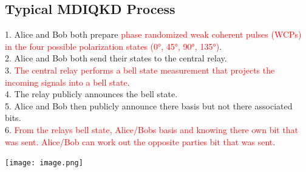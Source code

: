 \documentclass{article}
\begin{document}
\begin{tcolorbox}
\subsection*{Typical MDIQKD Process}

\begin{multicols}{2}

1. Alice and Bob both prepare \textcolor{red}{phase randomized weak coherent pulses (WCPs) in the four possible polarization states (\ang{0}, \ang{45}, \ang{90}, \ang{135})}.\\
2. Alice and Bob both send their states to the central relay.\\
3. \textcolor{red}{The central relay performs a bell state measurement that projects the incoming signals into a bell state}.\\
4. The relay publicly announces the bell state.\\
5. Alice and Bob then publicly announce there basis but not there associated bits.\\
6. \textcolor{red}{From the relays bell state, Alice/Bobs basis and knowing there own bit that was sent. Alice/Bob can work out the opposite parties bit that was sent}\cite{EPR}.

\columnbreak

\texttt{[image: image.png]}

\end{multicols}
\end{tcolorbox}

  
  
\end{document}
